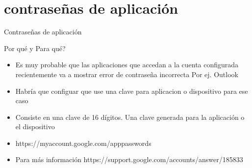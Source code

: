 \documentclass[11pt]{beamer}
\begin{document}
\section{contrase\~nas de aplicaci\'on}
\begin{frame}{Contrase\~nas de aplicaci\'on}
  \begin{block}{Por qu\'e y Para qu\'e?}
    \begin{itemize}
    	\item Es muy probable que las aplicaciones que accedan a la cuenta configurada recientemente va a mostrar error de contrase\~na incorrecta Por ej. Outlook
    	\item Habr\'ia que configuar que use una clave para aplicacion o dispositivo para ese caso
    	\item Consiste en una clave de 16 d\'igitos. Una clave generada para la aplicaci\'on o el dispositivo
    	\item https://myaccount.google.com/apppasswords 
    	\item Para m\'as informaci\'on https://support.google.com/accounts/answer/185833
    \end{itemize}
  \end{block}
\end{frame}
\end{document}
